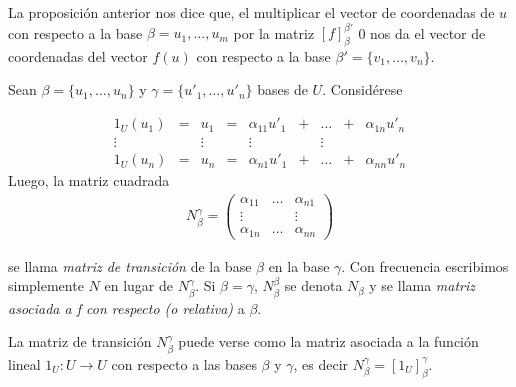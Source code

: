     	La proposición anterior nos dice que, el multiplicar el vector de coordenadas de $ u $ con respecto a la base $ \beta = {u_{1} , \ldots , u_{m} } $ por la matriz $ [f]_{\beta}^{\beta '} $ 0
    	nos da el vector de	coordenadas del vector $ f (u) $ con respecto a la base $ \beta ' = \{v_{1} , \ldots , v_{n} \} $.
    	\begin{defi} \label{def1.15}
    		 Sean $\beta =\{u_{1}, \ldots , u_{n}\} $ y $\gamma= \{u'_{1} , \ldots , u'_{n}\}$ bases de $U$.
Considérese
    	\end{defi}
    	\[\begin{array}{ccccccccc} 
    			1_{U}(u_{1}) &=& u_{1} &=& \alpha_{11}u'_{1} &+& \ldots& +& \alpha_{1n}u'_{n}  \\ \vdots & & \vdots & & \vdots & & \vdots && \\ 1_{U}(u_{n}) &=& u_{n} &=& \alpha_{n1}u'_{1} &+& \ldots& +& \alpha_{nn}u'_{n} 
    	\end{array}\]
    	Luego, la matriz cuadrada
    			\[\begin{array}{c}
    					N_{\beta}^{\gamma}= \left( \begin{array}{ccc}
    					\alpha_{11} & \ldots & \alpha_{n1} \\
    					\vdots &   &  \vdots \\
    					\alpha_{1n} & \ldots & \alpha_{nn}
    					\end{array} \right) 
    			\end{array}\]
    			
    			se llama \textit{matriz de transición} de la base $ \beta $ en la base $ \gamma $. Con frecuencia escribimos simplemente $ N $ en lugar de $ N_{\beta}^{\gamma} $. Si $ \beta = \gamma $, $ N_{\beta}^{\beta} $ se denota $ N_{\beta} $ y se llama \textit{matriz asociada a f con respecto (o relativa)} a $\beta$.
    			
    			La matriz de transición $ N_{\beta}^{\gamma} $ puede verse como la matriz asociada a la función	lineal $ 1_{U}:U \rightarrow U $ con respecto a las bases $\beta$ y $\gamma$, es decir $ N_{\beta}^{\gamma} = [1_{U}]_{\beta}^\gamma $.
    			
